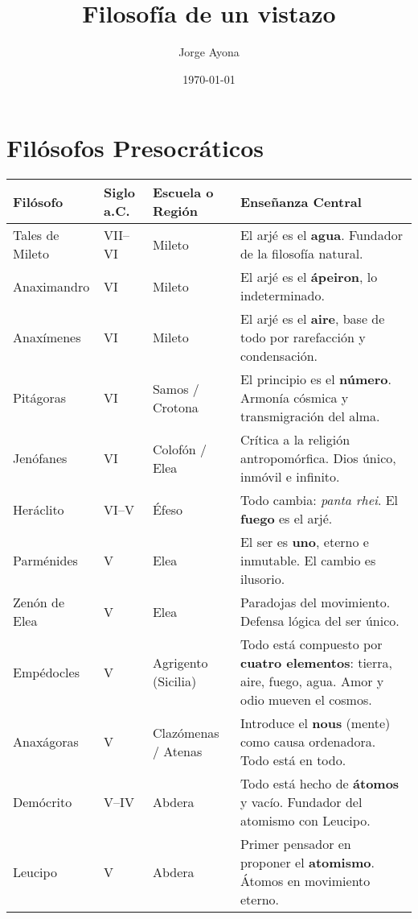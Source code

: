 \documentclass[12pt]{article}
\title{\textbf{Filosofía de un vistazo}}
\author{Jorge Ayona}
\date{\today}
\begin{document}
\maketitle

\section*{Filósofos Presocráticos}

\begin{tabularx}{\textwidth}{@{} l l l X @{}}
\toprule
\textbf{Filósofo} & \textbf{Siglo a.C.} & \textbf{Escuela o Región} & \textbf{Enseñanza Central} \\
\midrule
Tales de Mileto   & VII–VI  & Mileto             & El arjé es el \textbf{agua}. Fundador de la filosofía natural. \\
Anaximandro       & VI      & Mileto             & El arjé es el \textbf{ápeiron}, lo indeterminado. \\
Anaxímenes        & VI      & Mileto             & El arjé es el \textbf{aire}, base de todo por rarefacción y condensación. \\
Pitágoras         & VI      & Samos / Crotona    & El principio es el \textbf{número}. Armonía cósmica y transmigración del alma. \\
Jenófanes         & VI      & Colofón / Elea     & Crítica a la religión antropomórfica. Dios único, inmóvil e infinito. \\
Heráclito         & VI–V    & Éfeso              & Todo cambia: \emph{panta rhei}. El \textbf{fuego} es el arjé. \\
Parménides        & V       & Elea               & El ser es \textbf{uno}, eterno e inmutable. El cambio es ilusorio. \\
Zenón de Elea     & V       & Elea               & Paradojas del movimiento. Defensa lógica del ser único. \\
Empédocles        & V       & Agrigento (Sicilia) & Todo está compuesto por \textbf{cuatro elementos}: tierra, aire, fuego, agua. Amor y odio mueven el cosmos. \\
Anaxágoras        & V       & Clazómenas / Atenas & Introduce el \textbf{nous} (mente) como causa ordenadora. Todo está en todo. \\
Demócrito         & V–IV    & Abdera             & Todo está hecho de \textbf{átomos} y vacío. Fundador del atomismo con Leucipo. \\
Leucipo           & V       & Abdera             & Primer pensador en proponer el \textbf{atomismo}. Átomos en movimiento eterno. \\
\bottomrule
\end{tabularx}
\end{document}

